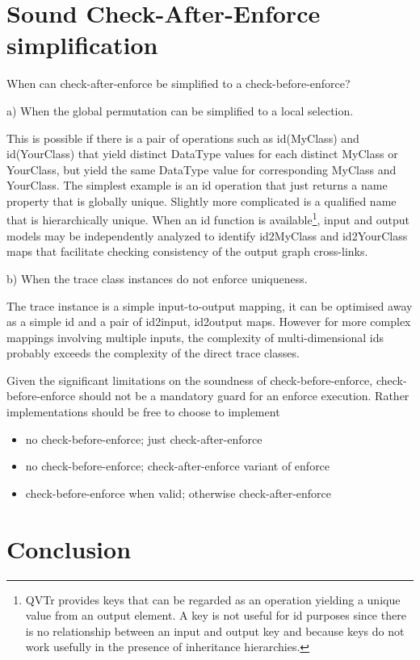 \documentclass{llncs}
\begin{document}
\section{Sound Check-After-Enforce simplification}

When can check-after-enforce be simplified to a check-before-enforce?

a) When the global permutation can be simplified to a local selection.

This is possible if there is a pair of operations such as id(MyClass) and id(YourClass) that yield distinct DataType values for each distinct MyClass or YourClass, but yield the same DataType value for corresponding MyClass and YourClass. The simplest example is an id operation that just returns a name property that is globally unique. Slightly more complicated is a qualified name that is hierarchically unique. When an id function is available\footnote{QVTr provides keys that can be regarded as an operation yielding a unique value from an output element. A key is not useful for id purposes since there is no relationship between an input and output key and because keys do not work usefully in the presence of inheritance hierarchies.}, input and output models may be independently analyzed to identify id2MyClass and id2YourClass maps that facilitate checking consistency of the output graph cross-links.

b) When the trace class instances do not enforce uniqueness.

The trace instance is a simple input-to-output mapping, it can be optimised away as a simple id and a pair of id2input, id2output maps. However for more complex mappings involving multiple inputs, the complexity of multi-dimensional ids probably exceeds the complexity of the direct trace classes.

Given the significant limitations on the soundness of check-before-enforce, check-before-enforce should not be a mandatory guard for an enforce execution. Rather implementations should be free to choose to implement 
\begin{itemize}
	\item no check-before-enforce; just check-after-enforce
	\item no check-before-enforce; check-after-enforce variant of enforce
	\item check-before-enforce when valid; otherwise check-after-enforce
\end{itemize}

\section{Conclusion}
\end{document}
